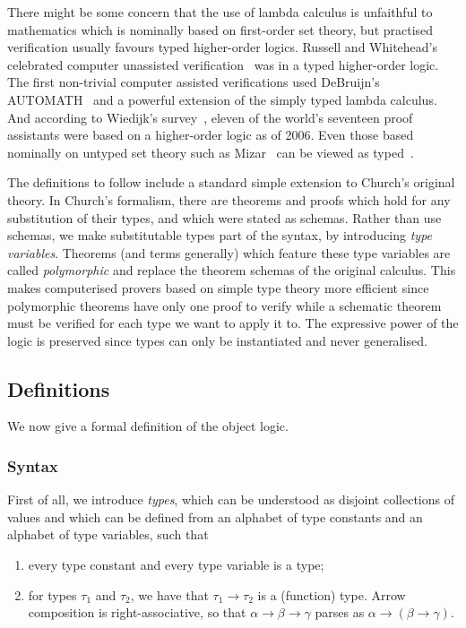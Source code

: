There might be some concern that the use of lambda calculus is unfaithful to mathematics which is nominally based on first-order set theory, but practised verification usually favours typed higher-order logics. Russell and Whitehead's celebrated computer unassisted verification~\cite{Principia} was in a typed higher-order logic. The first non-trivial computer assisted verifications used DeBruijn's AUTOMATH~\cite{AUTOMATH} and a powerful extension of the simply typed lambda calculus. And according to Wiedijk's survey~\cite{SeventeenProvers}, eleven of the world's seventeen proof assistants were based on a higher-order logic as of 2006. Even those based nominally on untyped set theory such as Mizar~\cite{MizarMathematicalVernacular} can be viewed as typed~\cite{MizarSoftTypes}.

The definitions to follow include a standard simple extension to Church's original theory. In Church's formalism, there are theorems and proofs which hold for any substitution of their types, and which were stated as schemas. Rather than use schemas, we make substitutable types part of the syntax, by introducing \emph{type variables}. Theorems (and terms generally) which feature these type variables are called \emph{polymorphic} and replace the theorem schemas of the original calculus. This makes computerised provers based on simple type theory more efficient since polymorphic theorems have only one proof to verify while a schematic theorem must be verified for each type we want to apply it to. The expressive power of the logic is preserved since types can only be instantiated and never generalised.

\subsection{Definitions}\label{sec:ObjectLogicFormal}
We now give a formal definition of the object logic.

\subsubsection{Syntax}
First of all, we introduce \emph{types}, which can be understood as disjoint collections of values and which can be defined from an alphabet of type constants and an alphabet of type variables, such that
\begin{enumerate}
\item every type constant and every type variable is a type;
\item for types $\tau_1$ and $\tau_2$, we have that $\tau_1 \rightarrow \tau_2$ is a (function) type. Arrow composition is right-associative, so that $\alpha \rightarrow \beta \rightarrow \gamma$ parses as $\alpha \rightarrow (\beta \rightarrow \gamma)$.
\end{enumerate}

